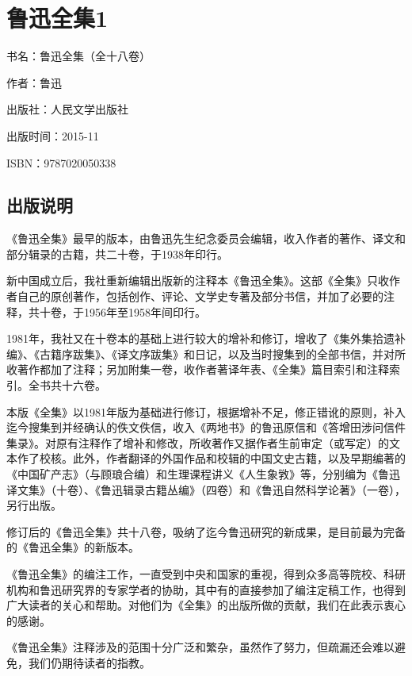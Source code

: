 


\section{鲁迅全集1}


\par 书名：鲁迅全集（全十八卷）
\par 作者：鲁迅
\par 出版社：人民文学出版社
\par 出版时间：2015-11
\par ISBN：9787020050338

\subsection{出版说明}


\par 《鲁迅全集》最早的版本，由鲁迅先生纪念委员会编辑，收入作者的著作、译文和部分辑录的古籍，共二十卷，于1938年印行。
\par 新中国成立后，我社重新编辑出版新的注释本《鲁迅全集》。这部《全集》只收作者自己的原创著作，包括创作、评论、文学史专著及部分书信，并加了必要的注释，共十卷，于1956年至1958年间印行。
\par 1981年，我社又在十卷本的基础上进行较大的增补和修订，增收了《集外集拾遗补编》、《古籍序跋集》、《译文序跋集》和日记，以及当时搜集到的全部书信，并对所收著作都加了注释；另加附集一卷，收作者著译年表、《全集》篇目索引和注释索引。全书共十六卷。
\par 本版《全集》以1981年版为基础进行修订，根据增补不足，修正错讹的原则，补入迄今搜集到并经确认的佚文佚信，收入《两地书》的鲁迅原信和《答增田涉问信件集录》。对原有注释作了增补和修改，所收著作又据作者生前审定（或写定）的文本作了校核。此外，作者翻译的外国作品和校辑的中国文史古籍，以及早期编著的《中国矿产志》（与顾琅合编）和生理课程讲义《人生象敩》等，分别编为《鲁迅译文集》（十卷）、《鲁迅辑录古籍丛编》（四卷）和《鲁迅自然科学论著》（一卷），另行出版。
\par 修订后的《鲁迅全集》共十八卷，吸纳了迄今鲁迅研究的新成果，是目前最为完备的《鲁迅全集》的新版本。
\par 《鲁迅全集》的编注工作，一直受到中央和国家的重视，得到众多高等院校、科研机构和鲁迅研究界的专家学者的协助，其中有的直接参加了编注定稿工作，也得到广大读者的关心和帮助。对他们为《全集》的出版所做的贡献，我们在此表示衷心的感谢。
\par 《鲁迅全集》注释涉及的范围十分广泛和繁杂，虽然作了努力，但疏漏还会难以避免，我们仍期待读者的指教。
\par {}
\par {}



